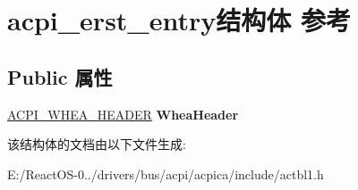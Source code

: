 \hypertarget{structacpi__erst__entry}{}\section{acpi\+\_\+erst\+\_\+entry结构体 参考}
\label{structacpi__erst__entry}
\subsection*{Public 属性}
\begin{DoxyCompactItemize}
\item 
\mbox{\label{structacpi__erst__entry_abcac1ec3c57144e6d259189a5d7d973b}} 
\hyperlink{structacpi__whea__header}{A\+C\+P\+I\+\_\+\+W\+H\+E\+A\+\_\+\+H\+E\+A\+D\+ER} {\bfseries Whea\+Header}
\end{DoxyCompactItemize}


该结构体的文档由以下文件生成\+:\begin{DoxyCompactItemize}
\item 
E\+:/\+React\+O\+S-\/0../drivers/bus/acpi/acpica/include/actbl1.\+h\end{DoxyCompactItemize}

